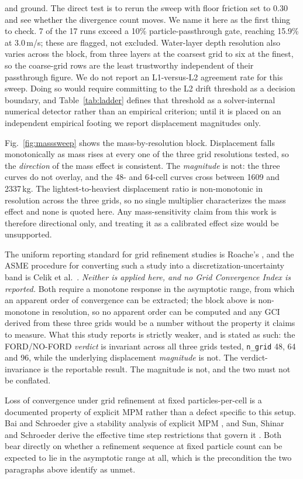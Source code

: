 \documentclass[conference]{IEEEtran}
\begin{document}
and ground. The direct test is to rerun the sweep with floor friction set to 0.30 and see whether the divergence count moves. We name it here as the first thing to check. 7 of the 17 runs exceed a 10\% particle-passthrough gate, reaching 15.9\% at 3.0\,m/s; these are flagged, not excluded. Water-layer depth resolution also varies across the block, from three layers at the coarsest grid to six at the finest, so the coarse-grid rows are the least trustworthy independent of their passthrough figure. We do not report an L1-versus-L2 agreement rate for this sweep. Doing so would require committing to the L2 drift threshold as a decision boundary, and Table~\ref{tab:ladder} defines that threshold as a solver-internal numerical detector rather than an empirical criterion; until it is placed on an independent empirical footing we report displacement magnitudes only.

Fig.~\ref{fig:masssweep} shows the mass-by-resolution block. Displacement falls monotonically as mass rises at every one of the three grid resolutions tested, so the \emph{direction} of the mass effect is consistent. The \emph{magnitude} is not: the three curves do not overlay, and the 48- and 64-cell curves cross between 1609 and 2337\,kg. The lightest-to-heaviest displacement ratio is non-monotonic in resolution across the three grids, so no single multiplier characterizes the mass effect and none is quoted here. Any mass-sensitivity claim from this work is therefore directional only, and treating it as a calibrated effect size would be unsupported.

The uniform reporting standard for grid refinement studies is Roache's \cite{roache1994}, and the ASME procedure for converting such a study into a discretization-uncertainty band is Celik et al.\ \cite{celik2008}. \emph{Neither is applied here, and no Grid Convergence Index is reported.} Both require a monotone response in the asymptotic range, from which an apparent order of convergence can be extracted; the block above is non-monotone in resolution, so no apparent order can be computed and any GCI derived from these three grids would be a number without the property it claims to measure. What this study reports is strictly weaker, and is stated as such: the FORD/NO-FORD \emph{verdict} is invariant across all three grids tested, \texttt{n\_grid} 48, 64 and 96, while the underlying displacement \emph{magnitude} is not. The verdict-invariance is the reportable result. The magnitude is not, and the two must not be conflated.

Loss of convergence under grid refinement at fixed particles-per-cell is a documented property of explicit MPM rather than a defect specific to this setup. Bai and Schroeder give a stability analysis of explicit MPM \cite{baischroeder2022}, and Sun, Shinar and Schroeder derive the effective time step restrictions that govern it \cite{sunshinarschroeder2020}. Both bear directly on whether a refinement sequence at fixed particle count can be expected to lie in the asymptotic range at all, which is the precondition the two paragraphs above identify as unmet.
\end{document}
